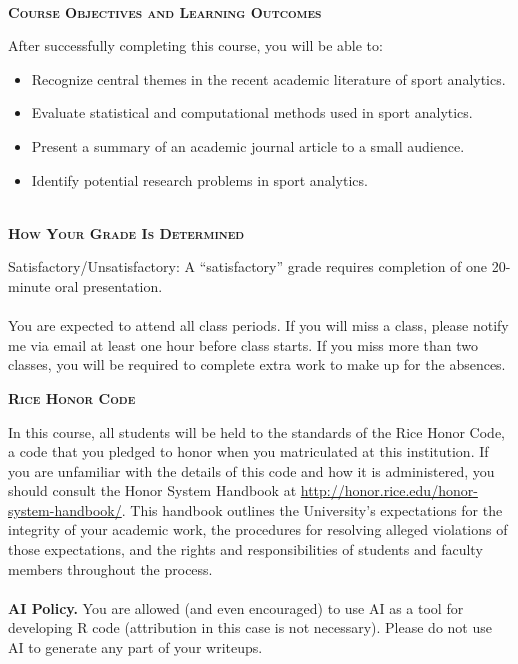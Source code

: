 \documentclass[11pt]{article}
\begin{document}
~\\
\textbf{\textsc{Course Objectives and Learning Outcomes}}
\begin{adjustwidth}{1cm}{0cm}
  After successfully completing this course, you will be able to:
  \begin{itemize}
    \item Recognize central themes in the recent academic literature of sport analytics.
    \item Evaluate statistical and computational methods used in sport analytics.
    \item Present a summary of an academic journal article to a small audience.
    \item Identify potential research problems in sport analytics.
  \end{itemize}
\end{adjustwidth}

~\\
\textbf{\textsc{How Your Grade Is Determined}}
\begin{adjustwidth}{1cm}{0cm}
  Satisfactory/Unsatisfactory: A ``satisfactory'' grade requires completion of one 20-minute oral presentation.\\
  ~\\
  You are expected to attend all class periods. If you will miss a class, please notify me via email at least one hour before class starts. If you miss more than two classes, you will be required to complete extra work to make up for the absences.
\end{adjustwidth}

\newpage
\textbf{\textsc{Rice Honor Code}}
\begin{adjustwidth}{1cm}{0cm}
  In this course, all students will be held to the standards of the Rice Honor Code, a code that you pledged to honor when you matriculated at this institution. If you are unfamiliar with the details of this code and how it is administered, you should consult the Honor System Handbook at \url{http://honor.rice.edu/honor-system-handbook/}. This handbook outlines the University's expectations for the integrity of your academic work, the procedures for resolving alleged violations of those expectations, and the rights and responsibilities of students and faculty members throughout the process.\\
  ~\\
  \textbf{AI Policy.} You are allowed (and even encouraged) to use AI as a tool for developing R code (attribution in this case is not necessary). Please do not use AI to generate any part of your writeups.
\end{adjustwidth}
\end{document}
